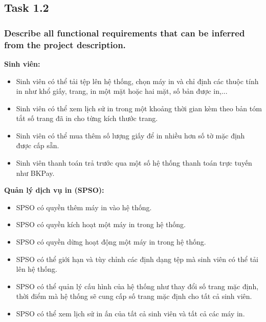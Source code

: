 \subsection{Task 1.2}
    \subsubsection{Describe all functional requirements that can be inferred from the project description.}
        \textbf{Sinh viên:}
            \begin{itemize}
                \item Sinh viên có thể tải tệp lên hệ thống, chọn máy in và chỉ định các thuộc tính in như khổ giấy, trang, in một mặt hoặc hai mặt, số bản được in,...
                \item Sinh viên có thể xem lịch sử in trong một khoảng thời gian kèm theo bản tóm tắt số trang đã in cho từng kích thước trang.
                \item Sinh viên có thể mua thêm số lượng giấy để in nhiều hơn số tờ mặc định được cấp sẵn.
                \item Sinh viên thanh toán trả trước qua một số hệ thống thanh toán trực tuyến như BKPay.
            \end{itemize}
            
        \textbf{Quản lý dịch vụ in (SPSO):}
            \begin{itemize}
                \item SPSO có quyền thêm máy in vào hệ thống.
                \item SPSO có quyền kích hoạt một máy in trong hệ thống.
                \item SPSO có quyền dừng hoạt động một máy in trong hệ thống.
                \item SPSO có thể giới hạn và tùy chỉnh các định dạng tệp mà sinh viên có thể tải lên hệ thống.
                \item SPSO có thể quản lý cấu hình của hệ thống như thay đổi số trang mặc định, thời điểm mà hệ thống sẽ cung cấp số trang mặc định cho tất cả sinh viên.
                \item SPSO có thể xem lịch sử in ấn của tất cả sinh viên và tất cả các máy in.
            \end{itemize}
            
